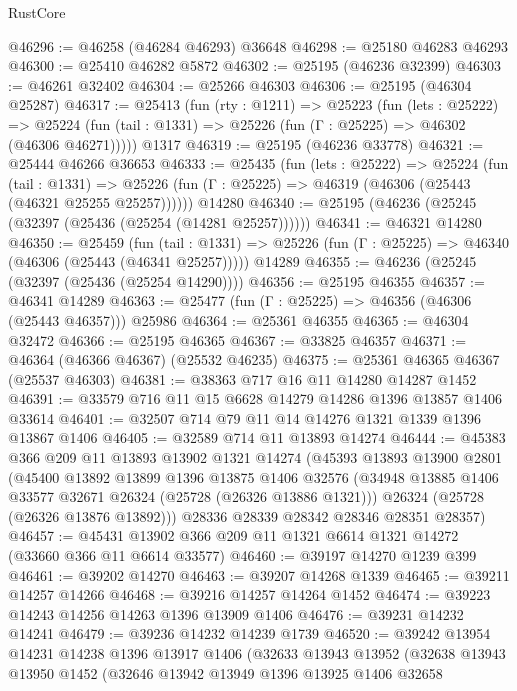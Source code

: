 \begin{lexlean}{RustCore}
\begin{coremodule}
@46296 := @46258 (@46284 @46293) @36648
@46298 := @25180 @46283 @46293
@46300 := @25410 @46282 @5872
@46302 := @25195 (@46236 @32399)
@46303 := @46261 @32402
@46304 := @25266 @46303
@46306 := @25195 (@46304 @25287)
@46317 := @25413
    (fun (rty : @1211) =>
    @25223
      (fun (lets : @25222) =>
      @25224 (fun (tail : @1331) => @25226 (fun (Γ : @25225) => @46302 (@46306 @46271)))))
    @1317
@46319 := @25195 (@46236 @33778)
@46321 := @25444 @46266 @36653
@46333 := @25435
    (fun (lets : @25222) =>
    @25224
      (fun (tail : @1331) =>
      @25226 (fun (Γ : @25225) => @46319 (@46306 (@25443 (@46321 @25255 @25257))))))
    @14280
@46340 := @25195 (@46236 (@25245 (@32397 (@25436 (@25254 (@14281 @25257))))))
@46341 := @46321 @14280
@46350 := @25459
    (fun (tail : @1331) => @25226 (fun (Γ : @25225) => @46340 (@46306 (@25443 (@46341 @25257)))))
    @14289
@46355 := @46236 (@25245 (@32397 (@25436 (@25254 @14290))))
@46356 := @25195 @46355
@46357 := @46341 @14289
@46363 := @25477 (fun (Γ : @25225) => @46356 (@46306 (@25443 @46357))) @25986
@46364 := @25361 @46355
@46365 := @46304 @32472
@46366 := @25195 @46365
@46367 := @33825 @46357
@46371 := @46364 (@46366 @46367) (@25532 @46235)
@46375 := @25361 @46365 @46367 (@25537 @46303)
@46381 := @38363 @717 @16 @11 @14280 @14287 @1452
@46391 := @33579 @716 @11 @15 @6628 @14279 @14286 @1396 @13857 @1406 @33614
@46401 := @32507 @714 @79 @11 @14 @14276 @1321 @1339 @1396 @13867 @1406
@46405 := @32589 @714 @11 @13893 @14274
@46444 := @45383
    @366
    @209
    @11
    @13893
    @13902
    @1321
    @14274
    (@45393
      @13893
      @13900
      @2801
      (@45400
        @13892
        @13899
        @1396
        @13875
        @1406
        @32576
        (@34948 @13885 @1406 @33577 @32671 @26324 (@25728 (@26326 @13886 @1321)))
        @26324
        (@25728 (@26326 @13876 @13892)))
      @28336
      @28339
      @28342
      @28346
      @28351
      @28357)
@46457 := @45431 @13902 @366 @209 @11 @1321 @6614 @1321 @14272 (@33660 @366 @11 @6614 @33577)
@46460 := @39197 @14270 @1239 @399
@46461 := @39202 @14270
@46463 := @39207 @14268 @1339
@46465 := @39211 @14257 @14266
@46468 := @39216 @14257 @14264 @1452
@46474 := @39223 @14243 @14256 @14263 @1396 @13909 @1406
@46476 := @39231 @14232 @14241
@46479 := @39236 @14232 @14239 @1739
@46520 := @39242
    @13954
    @14231
    @14238
    @1396
    @13917
    @1406
    (@32633
      @13943
      @13952
      (@32638
        @13943
        @13950
        @1452
        (@32646
          @13942
          @13949
          @1396
          @13925
          @1406
          @32658

\end{coremodule}
\end{lexlean}
